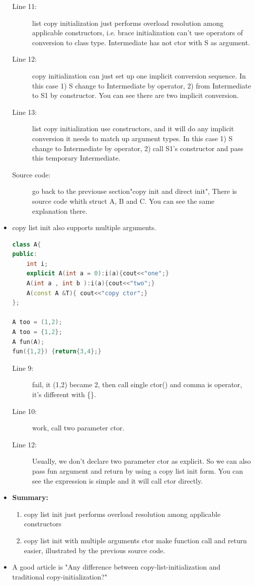 \documentclass[a4paper,11pt,twoside]{book}
\begin{document}
\begin{itemize}
\begin{description}
		\item[Line 11:] list copy initialization just performs overload resolution among applicable constructors, i.e. brace initialization can't use operators of conversion to class type. Intermediate has not ctor with S as argument.
		
		\item[Line 12:] copy initialization can just set up one implicit conversion sequence. In this case 1) S change to Intermediate by operator, 2) from Intermediate to S1 by constructor.  You can see there are two implicit conversion.
		
		\item[Line 13:] list copy initialization use constructors, and it will do any implicit conversion it needs to match up argument types. In this case 1) S change to Intermediate by operator, 2) call S1's constructor and pass this temporary Intermediate.
		\item [Source code:] go back to the previouse section"copy init and direct init", There is source code whith struct A, B and C. You can see the same explanation there. 
	\end{description}
	
	\item copy list init also supports multiple arguments.
\begin{lstlisting}[frame=single, language=c++]
class A{
public:
	int i;
	explicit A(int a = 0):i(a){cout<<"one";}
	A(int a , int b ):i(a){cout<<"two";}
	A(const A &T){ cout<<"copy ctor";} 
};
		
A too = (1,2); 
A too = {1,2};
A fun(A);
fun({1,2}) {return{3,4};}
\end{lstlisting}
	\begin{description}
		\item[Line 9:] fail, it (1,2) became 2, then call single ctor() and comma is operator, it's different with \{\}.
		
		\item[Line 10:] work, call two parameter ctor. 
		
		\item[Line 12:] Usually, we don't declare two parameter ctor as explicit. So we can also pass fun argument and return by using a copy list init form. You can see the expression is simple and it will call ctor directly. 
	\end{description}
	
	
	\item \textbf{Summary:}
	\begin{enumerate}
		\item copy list init just performs overload resolution among applicable constructors
		
		\item copy list init with multiple arguments ctor make function call and return easier, illustrated by the previous source code.
	\end{enumerate}
	
	\item A good article is "Any difference between copy-list-initialization and traditional copy-initialization?"
	
	
\end{itemize}
\end{document}

